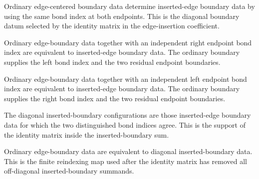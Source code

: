 \begin{definition}%
    \label{def:peps_edgeBoundaryToInsertedBoundaryConfig}
    \leanok
    Ordinary edge-centered boundary data determine inserted-edge boundary data
    by using the same bond index at both endpoints. This is the diagonal
    boundary datum selected by the identity matrix in the edge-insertion
    coefficient.
\end{definition}

\begin{definition}%
    \label{def:peps_edgeBoundaryRightIndexEquivInsertedBoundaryConfig}
    \leanok
    Ordinary edge-boundary data together with an independent right endpoint
    bond index are equivalent to inserted-edge boundary data. The ordinary
    boundary supplies the left bond index and the two residual endpoint
    boundaries.
\end{definition}

\begin{definition}%
    \label{def:peps_edgeBoundaryLeftIndexEquivInsertedBoundaryConfig}
    \leanok
    Ordinary edge-boundary data together with an independent left endpoint
    bond index are equivalent to inserted-edge boundary data. The ordinary
    boundary supplies the right bond index and the two residual endpoint
    boundaries.
\end{definition}

\begin{definition}%
    \label{def:peps_edgeDiagonalInsertedBoundaryConfig}
    \leanok
    The diagonal inserted-boundary configurations are those inserted-edge
    boundary data for which the two distinguished bond indices agree. This is
    the support of the identity matrix inside the inserted-boundary sum.
\end{definition}

\begin{definition}%
    \label{def:peps_edgeBoundaryConfigEquivDiagonalInsertedBoundaryConfig}
    \leanok
    Ordinary edge-boundary data are equivalent to diagonal inserted-boundary
    data. This is the finite reindexing map used after the identity matrix has
    removed all off-diagonal inserted-boundary summands.
\end{definition}
